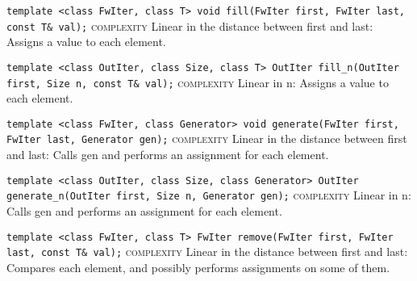 \noindent{}\hspace*{0.25em}\lstinline[basicstyle=\ttfamily\color{corange}]{template <class FwIter, class T> void fill(FwIter first, FwIter last, const T& val);} \textsc{complexity} Linear in the distance between first and last: Assigns a value to each element.\\\vspace{-0.6em}

\noindent{}\hspace*{0.25em}\lstinline[basicstyle=\ttfamily\color{corange}]{template <class OutIter, class Size, class T> OutIter fill_n(OutIter first, Size n, const T& val);} \textsc{complexity} Linear in n: Assigns a value to each element.\\\vspace{-0.6em}

\noindent{}\hspace*{0.25em}\lstinline[basicstyle=\ttfamily\color{corange}]{template <class FwIter, class Generator> void generate(FwIter first, FwIter last, Generator gen);} \textsc{complexity} Linear in the distance between first and last: Calls gen and performs an assignment for each element.\\\vspace{-0.6em}

\noindent{}\hspace*{0.25em}\lstinline[basicstyle=\ttfamily\color{corange}]{template <class OutIter, class Size, class Generator> OutIter generate_n(OutIter first, Size n, Generator gen);} \textsc{complexity} Linear in n: Calls gen and performs an assignment for each element.\\\vspace{-0.6em}

\noindent{}\hspace*{0.25em}\lstinline[basicstyle=\ttfamily\color{corange}]{template <class FwIter, class T> FwIter remove(FwIter first, FwIter last, const T& val);} \textsc{complexity} Linear in the distance between first and last: Compares each element, and possibly performs assignments on some of them.\\\vspace{-0.6em}

